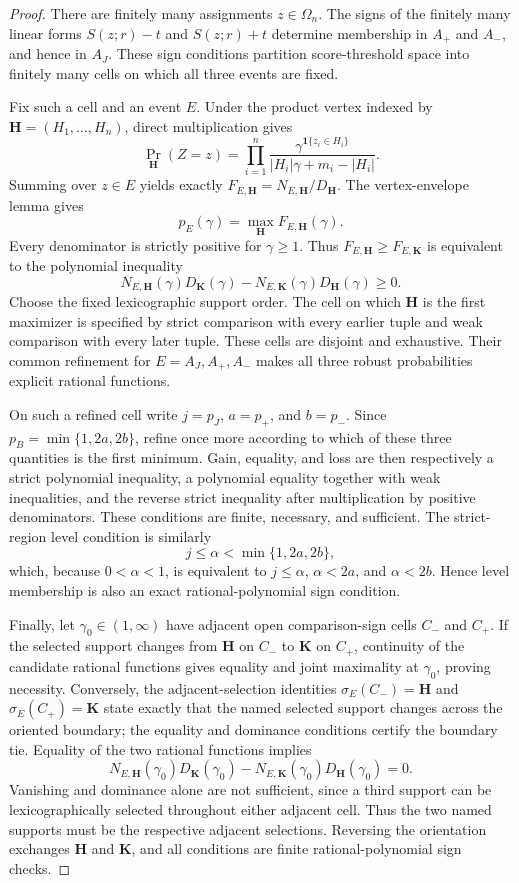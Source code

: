 \documentclass{article}
\begin{document}
\begin{proof}
There are finitely many assignments \(z\in\Omega_n\). The signs of the finitely many linear forms \(S(z;r)-t\) and \(S(z;r)+t\) determine membership in \(A_+\) and \(A_-\), and hence in \(A_J\). These sign conditions partition score-threshold space into finitely many cells on which all three events are fixed.

Fix such a cell and an event \(E\). Under the product vertex indexed by \(\mathbf H=(H_1,\ldots,H_n)\), direct multiplication gives
\[\Pr_{\mathbf H}(Z=z)=\prod_{i=1}^n\frac{\gamma^{\mathbf 1\{z_i\in H_i\}}}{|H_i|\gamma+m_i-|H_i|}.\]
Summing over \(z\in E\) yields exactly \(F_{E,\mathbf H}=N_{E,\mathbf H}/D_{\mathbf H}\). The vertex-envelope lemma gives
\[p_E(\gamma)=\max_{\mathbf H}F_{E,\mathbf H}(\gamma).\]
Every denominator is strictly positive for \(\gamma\ge1\). Thus \(F_{E,\mathbf H}\ge F_{E,\mathbf K}\) is equivalent to the polynomial inequality
\[N_{E,\mathbf H}(\gamma)D_{\mathbf K}(\gamma)-N_{E,\mathbf K}(\gamma)D_{\mathbf H}(\gamma)\ge0.\]
Choose the fixed lexicographic support order. The cell on which \(\mathbf H\) is the first maximizer is specified by strict comparison with every earlier tuple and weak comparison with every later tuple. These cells are disjoint and exhaustive. Their common refinement for \(E=A_J,A_+,A_-\) makes all three robust probabilities explicit rational functions.

On such a refined cell write \(j=p_J\), \(a=p_+\), and \(b=p_-\). Since \(p_B=\min\{1,2a,2b\}\), refine once more according to which of these three quantities is the first minimum. Gain, equality, and loss are then respectively a strict polynomial inequality, a polynomial equality together with weak inequalities, and the reverse strict inequality after multiplication by positive denominators. These conditions are finite, necessary, and sufficient. The strict-region level condition is similarly
\[j\le\alpha<\min\{1,2a,2b\},\]
which, because \(0<\alpha<1\), is equivalent to \(j\le\alpha\), \(\alpha<2a\), and \(\alpha<2b\). Hence level membership is also an exact rational-polynomial sign condition.

Finally, let \(\gamma_0\in(1,\infty)\) have adjacent open comparison-sign cells \(C_-\) and \(C_+\). If the selected support changes from \(\mathbf H\) on \(C_-\) to \(\mathbf K\) on \(C_+\), continuity of the candidate rational functions gives equality and joint maximality at \(\gamma_0\), proving necessity. Conversely, the adjacent-selection identities \(\sigma_E(C_-)=\mathbf H\) and \(\sigma_E(C_+)=\mathbf K\) state exactly that the named selected support changes across the oriented boundary; the equality and dominance conditions certify the boundary tie. Equality of the two rational functions implies
\[N_{E,\mathbf H}(\gamma_0)D_{\mathbf K}(\gamma_0)-N_{E,\mathbf K}(\gamma_0)D_{\mathbf H}(\gamma_0)=0.\]
Vanishing and dominance alone are not sufficient, since a third support can be lexicographically selected throughout either adjacent cell. Thus the two named supports must be the respective adjacent selections. Reversing the orientation exchanges \(\mathbf H\) and \(\mathbf K\), and all conditions are finite rational-polynomial sign checks.
\end{proof}
\end{document}

